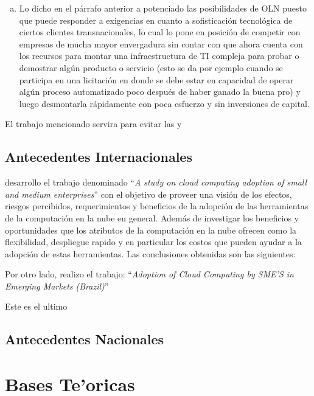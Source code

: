 \begin{enumerate}[a.]
          se ha tornado virtualmente infinita y aun as\'i sin que se tenga que
          incurrir en grandes inversiones y esperas.
    \item Lo dicho en el p\'arrafo anterior a potenciado las posibilidades de OLN
          puesto que puede responder a exigencias en cuanto a sofisticaci\'on
          tecnol\'ogica de ciertos clientes transnacionales, lo cual lo pone en
          posici\'on de competir con empresas de mucha mayor envergadura sin
          contar con que ahora cuenta con los recursos para montar una infraestructura
          de TI compleja para probar o demostrar alg\'un producto o servicio (esto
          se da por ejemplo cuando se participa en una licitaci\'on en donde se
          debe estar en capacidad de operar alg\'un proceso automatizado poco
          despu\'es de haber ganado la buena pro) y luego desmontarla r\'apidamente
          con poca esfuerzo y sin inversiones de capital.
\end{enumerate}

El trabajo mencionado servira para evitar las y

\subsection{Antecedentes Internacionales}
\cite{Salauddin} desarrollo el trabajo denominado ``\emph{A study on cloud
computing adoption of small and medium enterprises}'' con el objetivo de proveer
una visi\'on de los efectos, riesgos percibidos, requerimientos y beneficios de la
adopci\'on de las herramientas de la computaci\'on en la nube en general. Además
de investigar los beneficios y oportunidades que los atributos de la computaci\'on
en la nube ofrecen como la flexibilidad, despliegue rapido y en particular los
costos que pueden ayudar a la adopci\'on de estas herramientas. Las conclusiones
obtenidas son las siguientes:

Por otro lado, \citep{brimbela} realizo el trabajo: ``\emph{Adoption of Cloud
Computing by SME'S in Emerging Markets (Brazil)}''

Este es el ultimo \citep{saleem}
\subsection{Antecedentes Nacionales}

\section{Bases Te'oricas}

